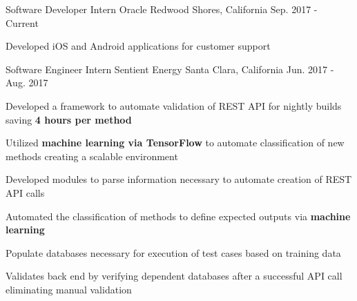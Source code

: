 


\begin{cventries}


\cventry
{Software Developer Intern} %
{Oracle} %
{Redwood Shores, California} %
{Sep. 2017 - Current} %
{
\begin{cvitems}
\item {Developed iOS and Android applications for customer support}
\end{cvitems}
}

\cventry
{Software Engineer Intern} %
{Sentient Energy} %
{Santa Clara, California} %
{Jun. 2017 - Aug. 2017} %
{ %
\begin{cvitems}
\item {Developed a framework to automate validation of REST API for nightly builds saving \textbf{4 hours per method}}
\item {Utilized \textbf{machine learning via TensorFlow} to automate classification of new methods creating a scalable environment}
\item {Developed modules to parse information necessary to automate creation of REST API calls}
\item {Automated the classification of methods to define expected outputs via \textbf{machine learning}}
\item {Populate databases necessary for execution of test cases based on training data}
\item {Validates back end by verifying dependent databases after a successful API call eliminating manual validation}
\end{cvitems}
}



\end{cventries}
